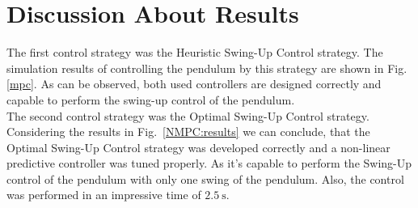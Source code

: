 \section{Discussion About Results}
The first control strategy was the Heuristic Swing-Up Control strategy. The simulation results of controlling the pendulum by this strategy are shown in Fig.\ref{mpc}. As can be observed, both used controllers are designed correctly and capable to perform the swing-up control of the pendulum. \\

The second control strategy was the Optimal Swing-Up Control strategy. Considering the results in Fig.~\ref{NMPC:results} we can conclude, that the Optimal Swing-Up Control strategy was developed correctly and a non-linear predictive controller was tuned properly. As it's capable to perform the Swing-Up control of the pendulum with only one swing of the pendulum. Also, the control was performed in an impressive time of $\SI{2.5}{\second}$.\\

